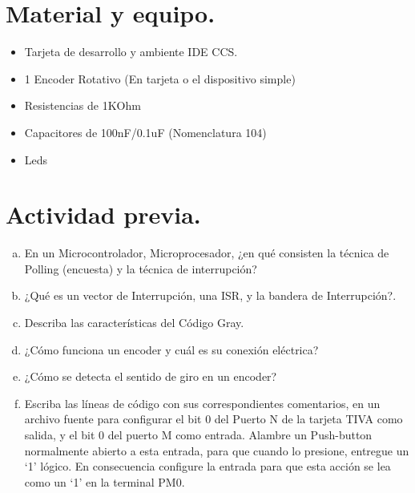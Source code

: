 \documentclass[a4paper,11pt]{article}                 %
\begin{document}
\section{Material y equipo.}
 
\begin{itemize}
	\item Tarjeta de desarrollo y ambiente IDE CCS. 
	\item 1 Encoder Rotativo (En tarjeta o el dispositivo simple)
	\item Resistencias de 1KOhm
	\item Capacitores de 100nF/0.1uF (Nomenclatura 104)
	\item Leds
\end{itemize}
  

  
\section{Actividad previa.}                   

  \begin{enumerate}[a)]
	\item En un Microcontrolador, Microprocesador, ¿en qué consisten la técnica de Polling (encuesta) y la técnica de interrupción?
	
	\item ¿Qué es un vector de Interrupción, una ISR, y la bandera de Interrupción?.
	
	\item Describa las características del Código Gray.
	
	\item ¿Cómo funciona un encoder y cuál es su conexión eléctrica?
	
	\item ¿Cómo se detecta el sentido de giro en un encoder?
	
	\item Escriba las líneas de código con sus correspondientes comentarios, en un archivo fuente 
	para configurar el bit 0 del Puerto N de la tarjeta TIVA como salida, y el bit 0 del puerto M 
	como  entrada.  Alambre  un  Push-button    normalmente  abierto  a  esta  entrada,  para  que 
	cuando lo presione, entregue un ‘1’ lógico. En consecuencia configure la entrada para que 
	esta acción se lea como un ‘1’ en la terminal PM0.  
	
	
\end{enumerate}
\end{document}
